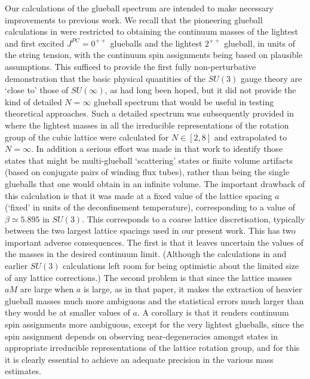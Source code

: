 \documentclass[12pt]{article}
\begin{document}
Our calculations of the glueball spectrum are intended to make necessary improvements to
previous work. We recall that the pioneering glueball calculations in
%
\cite{BLMT_N,BLMTUW_N}
%
were restricted to obtaining the continuum masses of the lightest and first excited 
$J^{PC}=0^{++}$ glueballs and the lightest $2^{++}$ glueball, 
in units of the string tension, with the continuum spin assignments being based on plausible
assumptions. This sufficed to provide the first fully non-perturbative demonstration that 
the basic physical quantities of the  $SU(3)$ gauge theory are `close to' those of $SU(\infty)$, 
as had long been hoped, but it did not provide the kind of detailed $N=\infty$ glueball spectrum 
that would be useful in testing theoretical approaches. Such a detailed spectrum was
subsequently provided in 
%
\cite{BLARER_N}
%
where the lightest masses in all the  irreducible representations of the rotation group of 
the cubic lattice were calculated for $N\in [2,8]$ and extrapolated to $N=\infty$. In addition 
a serious effort was made in that work to identify those states that might be multi-glueball 
`scattering' states or finite volume artifacts (based on conjugate pairs of winding flux tubes), 
rather than being the single glueballs that one would obtain in an infinite volume.  
The important drawback of this calculation is that it was made at a fixed value of 
the lattice spacing $a$ (`fixed' in units of the deconfinement temperature), corresponding 
to a value of $\beta \simeq 5.895$ in $SU(3)$. This corresponds to a coarse lattice 
discretisation, typically between the two largest lattice spacings used in our present work.
This has two important adverse consequences. The first is that it leaves uncertain
the values of the masses in the desired continuum limit. (Although the calculations in
%
\cite{BLARER_N}
%
and earlier $SU(3)$ calculations left room for being optimistic about the limited
size of any lattice corrections.) The second problem is that since the lattice 
masses $aM$ are large when $a$ is large, as in that paper, it makes the extraction
of heavier glueball masses much more ambiguous and the statistical errors much larger
than they would be at smaller values of $a$. A corollary is that it renders
continuum spin assignments more ambiguous, except for the very lightest glueballs,
since the spin assignment depends on observing near-degeneracies amongst states 
in appropriate irreducible representations of the lattice rotation group, and for this 
it is clearly essential to achieve an adequate precision in the various mass estimates. 
\end{document}

